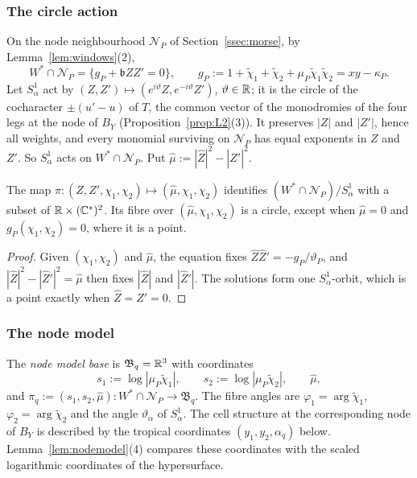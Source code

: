 \subsubsection*{The circle action}
On the node neighbourhood $\mathcal N_P$ of Section~\ref{ssec:morse}, by Lemma~\ref{lem:windows}(2),
\[
W^*\cap\mathcal N_P=\{g_P+\mathfrak bZZ'=0\},\qquad g_P:=1+\tilde\chi_1+\tilde\chi_2+\mu_P\tilde\chi_1\tilde\chi_2=xy-\kappa_P .
\]
Let $S^1_\alpha$ act by $(Z,Z')\mapsto(e^{i\vartheta}Z,e^{-i\vartheta}Z')$, $\vartheta\in\mathbb R$; it is the circle of the cocharacter
$\pm(u'-u)$ of $T$, the common vector of the monodromies of the four legs at the node of $B_Y$
(Proposition~\ref{prop:L2}(3)). It preserves $|Z|$ and $|Z'|$, hence all weights, and every monomial surviving on
$\mathcal N_P$ has equal exponents in $Z$ and $Z'$. So $S^1_\alpha$ acts on $W^*\cap\mathcal N_P$. Put
$\hat\mu:=|\hat Z|^2-|\hat Z'|^2$.

\begin{lemma}\label{lem:quot}
The map $\pi\colon(Z,Z',\chi_1,\chi_2)\mapsto(\hat\mu,\chi_1,\chi_2)$ identifies $(W^*\cap\mathcal N_P)/S^1_\alpha$ with a
subset of $\mathbb R\times(\mathbb C^*)^2$. Its fibre over $(\hat\mu,\chi_1,\chi_2)$ is a circle, except when $\hat\mu=0$ and
$g_P(\chi_1,\chi_2)=0$, where it is a point.
\end{lemma}

\begin{proof}
Given $(\chi_1,\chi_2)$ and $\hat\mu$, the equation fixes $\hat Z\hat Z'=-g_P/\vartheta_P$, and
$|\hat Z|^2-|\hat Z'|^2=\hat\mu$ then fixes $|\hat Z|$ and $|\hat Z'|$. The solutions form one $S^1_\alpha$-orbit, which is
a point exactly when $\hat Z=\hat Z'=0$.
\end{proof}

\subsubsection*{The node model}
The \emph{node model base} is $\mathfrak B_q=\mathbb R^3$ with coordinates
\[
s_1:=\log|\mu_P\tilde\chi_1|,\qquad s_2:=\log|\mu_P\tilde\chi_2|,\qquad \hat\mu,
\]
and $\pi_q:=(s_1,s_2,\hat\mu)\colon W^*\cap\mathcal N_P\to\mathfrak B_q$. The fibre angles are $\varphi_1=\arg\tilde\chi_1$,
$\varphi_2=\arg\tilde\chi_2$ and the angle $\vartheta_\alpha$ of $S^1_\alpha$. The cell structure at the corresponding
node of $B_Y$ is described by the tropical coordinates $(y_1,y_2,\alpha_q)$ below. Lemma~\ref{lem:nodemodel}(4)
compares these coordinates with the scaled logarithmic coordinates of the hypersurface.


